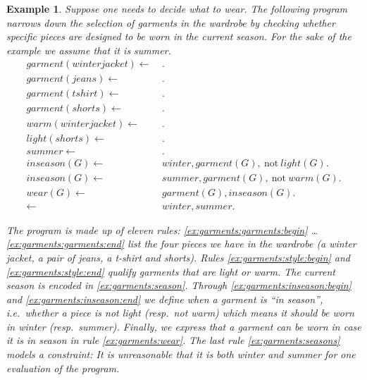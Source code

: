 \documentclass{vutinfth} %
\newtheorem{example}{Example}[section]
\newcommand{\fail}{\mathrm{not } \ \xspace}
\newcommand{\from}{\ensuremath{\leftarrow}}
\begin{document}
\begin{example}
\label{ex:garments}
Suppose one needs to decide what to wear. The following program narrows down the selection of garments in the wardrobe by checking whether specific pieces are designed to be worn in the current season. For the sake of the example we assume that it is summer.
\begin{align}
garment(winterjacket)\from& \ .\tag{$f_1$}\label{ex:garments:garments:begin}\\
garment(jeans)\from& \ .\tag{$f_2$}\\
garment(tshirt)\from& \ .\tag{$f_3$}\\
garment(shorts)\from& \ .\tag{$f_4$}\label{ex:garments:garments:end}\\
warm(winterjacket)\from& \ .\tag{$f_5$}\label{ex:garments:style:begin}\\
light(shorts)\from& \ .\tag{$f_6$}\label{ex:garments:style:end}\\
summer\from& \ .\tag{$f_7$}\label{ex:garments:season}\\
inseason(G) \from& \ winter, garment(G),~\fail light(G). \tag{$r_1$}\label{ex:garments:inseason:begin}\\
inseason(G) \from& \ summer, garment(G),~\fail warm(G). \tag{$r_2$}\label{ex:garments:inseason:end}\\
wear(G) \from& \ garment(G), inseason(G). \tag{$r_3$}\label{ex:garments:wear}\\
\from& \ winter, summer. \tag{$c_1$}\label{ex:garments:seasons}
\end{align}

The program is made up of eleven rules: \ref{ex:garments:garments:begin} \ldots \ref{ex:garments:garments:end} list the four pieces we have in the wardrobe (a winter jacket, a pair of jeans, a t-shirt and shorts). Rules \ref{ex:garments:style:begin} and \ref{ex:garments:style:end} qualify garments that are light or warm. The current season is encoded in \ref{ex:garments:season}. Through \ref{ex:garments:inseason:begin} and \ref{ex:garments:inseason:end} we define when a garment is \enquote{in season}, i.e.~whether a piece is not light (resp.~not warm) which means it should be worn in winter (resp.~summer). Finally, we express that a garment can be worn in case it is in season in rule \ref{ex:garments:wear}. The last rule \ref{ex:garments:seasons} models a constraint: It is unreasonable that it is both winter and summer for one evaluation of the program.
\end{example}
\end{document}
